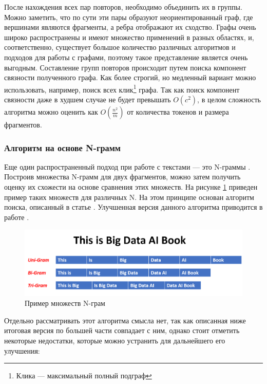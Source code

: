 \documentclass[14pt]{matmex-diploma-custom}
\begin{document}
После нахождения всех пар повторов, необходимо объединить их в группы. Можно заметить, что по сути эти пары образуют неориентированный граф, где вершинами являются фрагменты, а ребра отображают их сходство. Графы очень широко распространены и имеют множество применений в разных областях, и, соответственно, существует большое количество различных алгоритмов и подходов для работы с графами, поэтому такое представление является очень выгодным. Составление групп повторов происходит путем поиска компонент связности полученного графа. Как более строгий, но медленный вариант можно использовать, например, поиск всех клик\footnote{Клика --- максимальный полный подграф} графа. Так как поиск компонент связности даже в худшем случае не будет превышать $O(c^2)$, в целом сложность алгоритма можно оценить как $O(\frac{n^2}{m})$ от количества токенов и размера фрагментов.

\subsubsection{Алгоритм на основе N-грамм}

Еще один распространенный подход при работе с текстами --- это N-граммы \cite{bib:art:Ngram}. Построив множества N-грамм для двух фрагментов, можно затем получить оценку их схожести на основе сравнения этих множеств. На рисунке \ref{fig:Ngram} приведен пример таких множеств для различных N. На этом принципе основан алгоритм поиска, описанный в статье \cite{bib:tool:NgramSearch}. Улучшенная версия данного алгоритма приводится в работе \cite{bib:tool:ImprovedNgramSearch}.

\begin{figure}[h!]
	\includegraphics[scale=0.37]{pictures/Ngram.png}
	\centering
	\caption{Пример множеств N-грам}
	\label{fig:Ngram}
\end{figure}

Отдельно рассматривать этот алгоритма смысла нет, так как описанная ниже итоговая версия по большей части совпадает с ним, однако стоит отметить некоторые недостатки, которые можно устранить для дальнейшего его улучшения:
\end{document}
